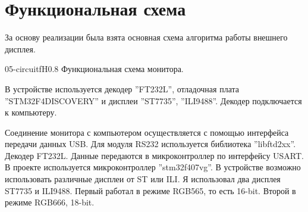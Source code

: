 \chapter{Функциональная схема}

	За основу реализации была взята основная схема алгоритма работы внешнего дисплея.

	{05-circuit}{f}{H}{0.8\textwidth}
	{Функциональная схема монитора.} %
	
	В устройстве используется декодер ''FT232L'', отладочная плата ''STM32F4DISCOVERY'' и дисплеи ''ST7735'', ''ILI9488''. Декодер подключается к компьютеру.
	
	Соединение монитора с компьютером осуществляется с помощью интерфейса передачи данных USB. Для модуля RS232 используется библиотека ''libftd2xx''. Декодер FT232L. Данные передаются в микроконтроллер по интерфейсу USART. В проекте используется микроконтроллер ''stm32f407vg''. В устройстве возможно использовать различные дисплеи от ST или ILI. Я использовал два дисплея ST7735 и ILI9488. Первый работал в режиме RGB565, то есть 16-bit. Второй в режиме RGB666, 18-bit.
	

